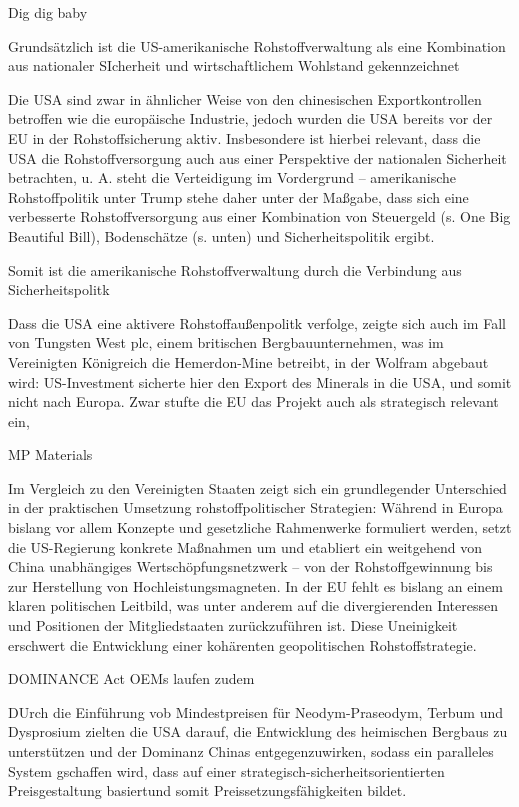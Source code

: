 \documentclass[12pt,a4paper,oneside]{book} %
\begin{document}
{\glqq Dig dig baby\grqq

Grundsätzlich ist die US-amerikanische Rohstoffverwaltung als eine Kombination aus nationaler SIcherheit und wirtschaftlichem Wohlstand gekennzeichnet

Die USA sind zwar in ähnlicher Weise von den chinesischen Exportkontrollen betroffen wie die europäische Industrie, jedoch wurden die USA bereits vor der EU in der Rohstoffsicherung aktiv. Insbesondere ist hierbei relevant, dass die USA die Rohstoffversorgung auch aus einer Perspektive der nationalen Sicherheit betrachten, u. A. steht die Verteidigung im Vordergrund -- amerikanische Rohstoffpolitik unter Trump stehe daher unter der Maßgabe, dass sich eine verbesserte Rohstoffversorgung aus einer Kombination von Steuergeld (s. One Big Beautiful Bill), Bodenschätze (s. unten) und Sicherheitspolitik ergibt.\autocite{Handelsblatt Bastian Kullik}

Somit ist die amerikanische Rohstoffverwaltung durch die Verbindung aus Sicherheitspolitk




Dass die USA eine aktivere Rohstoffaußenpolitk verfolge, zeigte sich auch im Fall von Tungsten West plc, einem britischen Bergbauunternehmen, was im Vereinigten Königreich die Hemerdon-Mine betreibt, in der Wolfram abgebaut wird: US-Investment sicherte hier den Export des Minerals in die USA, und somit nicht nach Europa. Zwar stufte die EU das Projekt auch als strategisch relevant ein,

MP Materials

Im Vergleich zu den Vereinigten Staaten zeigt sich ein grundlegender Unterschied in der praktischen Umsetzung rohstoffpolitischer Strategien: Während in Europa bislang vor allem Konzepte und gesetzliche Rahmenwerke formuliert werden, setzt die US-Regierung konkrete Maßnahmen um und etabliert ein weitgehend von China unabhängiges Wertschöpfungsnetzwerk – von der Rohstoffgewinnung bis zur Herstellung von Hochleistungsmagneten. In der EU fehlt es bislang an einem klaren politischen Leitbild, was unter anderem auf die divergierenden Interessen und Positionen der Mitgliedstaaten zurückzuführen ist. Diese Uneinigkeit erschwert die Entwicklung einer kohärenten geopolitischen Rohstoffstrategie.\autocite{Handelsblatt Bastian Kullik}

DOMINANCE Act
OEMs laufen zudem 

DUrch die Einführung vob Mindestpreisen für Neodym-Praseodym, Terbum und Dysprosium zielten die USA darauf, die Entwicklung des heimischen Bergbaus zu unterstützen und der Dominanz Chinas entgegenzuwirken, sodass ein paralleles System gschaffen wird, dass auf einer \glqq strategisch-sicherheitsorientierten Preisgestaltung basiert\grqq und somit Preissetzungsfähigkeiten bildet.\autocite{https://www.spglobal.com/energy/en/news-research/latest-news/metals/052926-us-rare-earth-price-floors-aim-to-challenge-chinas-market-grip}

}
\end{document}
